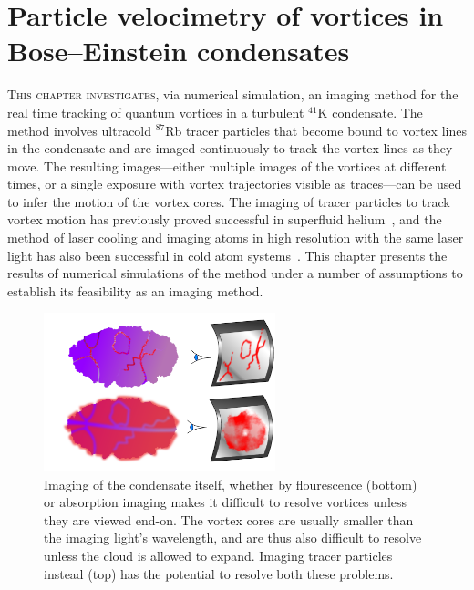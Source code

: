 
\chapter{Particle velocimetry of vortices in Bose–Einstein condensates}\label{chap:velocimetry}

\lettrine[lines=3]{T}{his chapter investigates}, via numerical simulation, an imaging method for the real time tracking of quantum vortices in a turbulent $^{41}$K condensate. The method involves ultracold $^{87}$Rb tracer particles that become bound to vortex lines in the condensate and are imaged continuously to track the vortex lines as they move. The resulting images---either multiple images of the vortices at different times, or a single exposure with vortex trajectories visible as traces---can be used to infer the motion of the vortex cores. The imaging of tracer particles to track vortex motion has previously proved successful in superfluid helium~\cite{bewley_generation_2009, bewley_superfluid_2006, packard_vortex_1982}, and the method of laser cooling and imaging atoms in high resolution with the same laser light has also been successful in cold atom systems~\cite{bakr_quantum_2009}. This chapter presents the results of numerical simulations of the method under a number of assumptions to establish its feasibility as an imaging method. 

\begin{figure}
\begin{center}
\includegraphics[width=0.6\textwidth]{figures/unsorted/side-on.pdf}
\caption{\label{fig:side-on}Imaging of the condensate itself, whether by flourescence (bottom) or absorption imaging makes it difficult to resolve vortices unless they are viewed end-on. The vortex cores are usually smaller than the imaging light's wavelength, and are thus also difficult to resolve unless the cloud is allowed to expand. Imaging tracer particles instead (top) has the potential to resolve both these problems.}\label{fig:side_on}
\end{center}
\end{figure}

